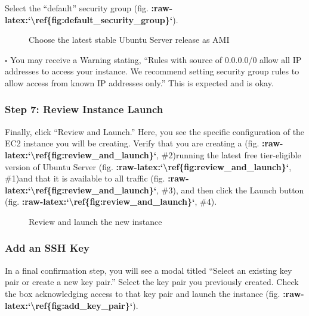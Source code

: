 \documentclass[letterpaper,10pt,english]{sphinxmanual}
\begin{document}
Select the “default” security group (fig.
{\color{red}\bfseries{}:raw-latex:{}`\textbackslash{}ref\{fig:default\_security\_group\}{}`}).

\begin{figure}[htbp]
\centering
\capstart

\noindent{}
\caption{Choose the latest stable Ubuntu Server release as AMI}\label{\detokenize{02-elastic-compute-cloud:id35}}\end{figure}

\(\square\)  You may receive a Warning stating, “Rules with
source of 0.0.0.0/0 allow all IP addresses to access your instance. We
recommend setting security group rules to allow access from known IP
addresses only.” This is expected and is okay.


\subsubsection{Step 7: Review Instance Launch}
\label{\detokenize{02-elastic-compute-cloud:Step-7:-Review-Instance-Launch}}
Finally, click “Review and Launch.” Here, you see the specific
configuration of the EC2 instance you will be creating. Verify that you
are creating a  (fig.
{\color{red}\bfseries{}:raw-latex:{}`\textbackslash{}ref\{fig:review\_and\_launch\}{}`}, \#2)running the latest free
tier-eligible version of Ubuntu Server (fig.
{\color{red}\bfseries{}:raw-latex:{}`\textbackslash{}ref\{fig:review\_and\_launch\}{}`}, \#1)and that it is available to
all traffic (fig. {\color{red}\bfseries{}:raw-latex:{}`\textbackslash{}ref\{fig:review\_and\_launch\}{}`}, \#3), and
then click the Launch button (fig.
{\color{red}\bfseries{}:raw-latex:{}`\textbackslash{}ref\{fig:review\_and\_launch\}{}`}, \#4).

\begin{figure}[htbp]
\centering
\capstart

\noindent{}
\caption{Review and launch the new instance}\label{\detokenize{02-elastic-compute-cloud:id36}}\end{figure}


\subsubsection{Add an SSH Key}
\label{\detokenize{02-elastic-compute-cloud:Add-an-SSH-Key}}
In a final confirmation step, you will see a modal titled “Select an
existing key pair or create a new key pair.” Select the key pair you
previously created. Check the box acknowledging access to that key pair
and launch the instance (fig. {\color{red}\bfseries{}:raw-latex:{}`\textbackslash{}ref\{fig:add\_key\_pair\}{}`}).
\end{document}
